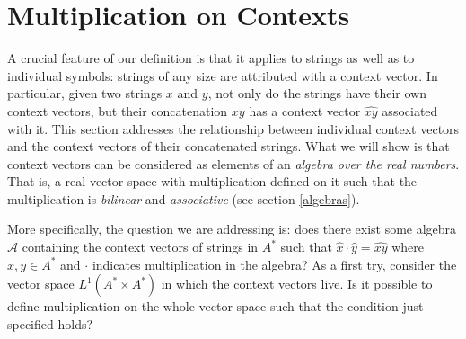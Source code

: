 \documentclass[11pt]{report}
\begin{document}
\section{Multiplication on Contexts}


A crucial feature of our definition is that it applies to strings as well as to individual symbols: strings of any size are attributed with a context vector. In particular, given two strings $x$ and $y$, not only do the strings have their own context vectors, but their concatenation $xy$ has a context vector $\widehat{xy}$ associated with it. This section addresses the relationship between individual context vectors and the context vectors of their concatenated strings. What we will show is that context vectors can be considered as elements of an \emph{algebra over the real numbers}. That is, a real vector space with multiplication defined on it such that the multiplication is \emph{bilinear} and \emph{associative} (see section \ref{algebras}).

More specifically, the question we are addressing is: does there exist some algebra $\mathcal{A}$ containing the context vectors of strings in $A^*$ such that $\hat{x}\cdot \hat{y} = \widehat{xy}$ where $x,y\in A^*$ and $\cdot$ indicates multiplication in the algebra? As a first try, consider the vector space $L^1(A^*\times A^*)$ in which the context vectors live. Is it possible to define multiplication on the whole vector space such that the condition just specified holds?
\end{document}
